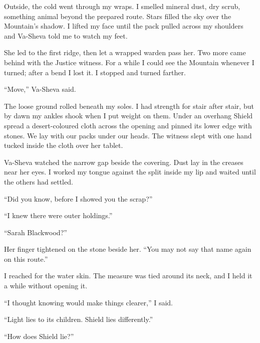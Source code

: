 \ornament

Outside, the cold went through my wraps. I smelled mineral dust, dry scrub, something animal beyond the prepared route. Stars filled the sky over the Mountain's shadow. I lifted my face until the pack pulled across my shoulders and Va-Sheva told me to watch my feet.\par

She led to the first ridge, then let a wrapped warden pass her. Two more came behind with the Justice witness. For a while I could see the Mountain whenever I turned; after a bend I lost it. I stopped and turned farther.\par

``Move,'' Va-Sheva said.\par

The loose ground rolled beneath my soles. I had strength for stair after stair, but by dawn my ankles shook when I put weight on them. Under an overhang Shield spread a desert-coloured cloth across the opening and pinned its lower edge with stones. We lay with our packs under our heads. The witness slept with one hand tucked inside the cloth over her tablet.\par

Va-Sheva watched the narrow gap beside the covering. Dust lay in the creases near her eyes. I worked my tongue against the split inside my lip and waited until the others had settled.\par

``Did you know, before I showed you the scrap?''\par

``I knew there were outer holdings.''\par

``Sarah Blackwood?''\par

Her finger tightened on the stone beside her. ``You may not say that name again on this route.''\par

I reached for the water skin. The measure was tied around its neck, and I held it a while without opening it.\par

``I thought knowing would make things clearer,'' I said.\par

``Light lies to its children. Shield lies differently.''\par

``How does Shield lie?''\par

